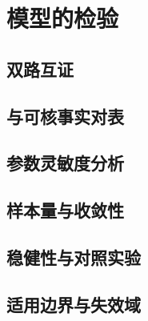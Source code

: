 %
\section{模型的检验}

\subsection{双路互证}

\subsection{与可核事实对表}

\subsection{参数灵敏度分析}

\subsection{样本量与收敛性}

\subsection{稳健性与对照实验}

\subsection{适用边界与失效域}

